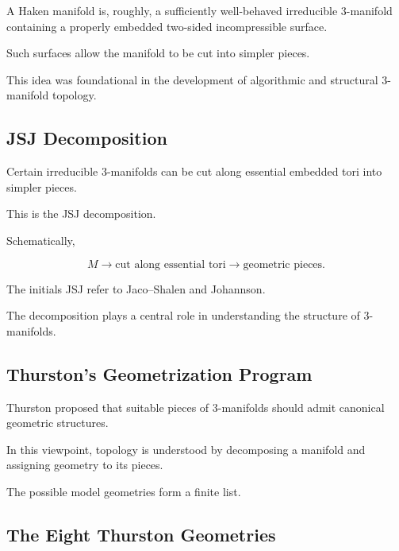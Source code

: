 A Haken manifold is, roughly, a sufficiently well-behaved irreducible
\(3\)-manifold containing a properly embedded two-sided incompressible
surface.

Such surfaces allow the manifold to be cut into simpler pieces.

This idea was foundational in the development of algorithmic and structural
\(3\)-manifold topology.

\subsection{JSJ Decomposition}
\label{subsec:jsj-decomposition}

Certain irreducible \(3\)-manifolds can be cut along essential embedded tori
into simpler pieces.

This is the JSJ decomposition.

Schematically,

\[
\boxed{
M
\longrightarrow
\text{cut along essential tori}
\longrightarrow
\text{geometric pieces}.
}
\]

The initials JSJ refer to Jaco--Shalen and Johannson.

The decomposition plays a central role in understanding the structure of
\(3\)-manifolds.

\subsection{Thurston's Geometrization Program}
\label{subsec:thurston-geometrization}

Thurston proposed that suitable pieces of \(3\)-manifolds should admit
canonical geometric structures.

In this viewpoint, topology is understood by decomposing a manifold and
assigning geometry to its pieces.

The possible model geometries form a finite list.

\subsection{The Eight Thurston Geometries}
\label{subsec:eight-thurston-geometries}

